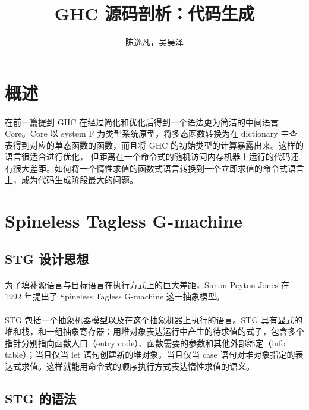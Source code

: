 \documentclass{article}
\author{陈逸凡，吴昊泽}
\title{GHC 源码剖析：代码生成}
\begin{document}
	\maketitle
	\section{概述}
	\paragraph{}
	在前一篇提到 GHC 在经过简化和优化后得到一个语法更为简洁的中间语言 Core。Core 以 system F 为类型系统原型，将多态函数转换为在 dictionary 中查表得到对应的单态函数的函数，而且将 GHC 的初始类型的计算暴露出来。这样的语言很适合进行优化， 但距离在一个命令式的随机访问内存机器上运行的代码还有很大差距。如何将一个惰性求值的函数式语言转换到一个立即求值的命令式语言上，成为代码生成阶段最大的问题。
	\section{Spineless Tagless G-machine}
	\subsection{STG 设计思想}
	\paragraph{}
	为了填补源语言与目标语言在执行方式上的巨大差距，Simon Peyton Jones 在 1992 年提出了 Spineless Tagless G-machine 这一抽象模型\cite{implementing-lazy-functional-languages-on-stock-hardware-the-spineless-tagless-g-machine}。
	\paragraph{}
	STG 包括一个抽象机器模型以及在这个抽象机器上执行的语言。STG 具有显式的堆和栈，和一组抽象寄存器：用堆对象表达运行中产生的待求值的式子，包含多个指针分别指向函数入口（entry code）、函数需要的参数和其他外部绑定（info table）；当且仅当 let 语句创建新的堆对象，当且仅当 case 语句对堆对象指定的表达式求值。这样就能用命令式的顺序执行方式表达惰性求值的语义。
	\subsection{STG 的语法}
\end{document}
